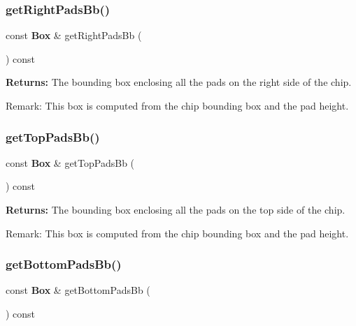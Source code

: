 \subsubsection{\texorpdfstring{get\+Right\+Pads\+Bb()}{getRightPadsBb()}}
{\footnotesize\ttfamily const \textbf{ Box} \& get\+Right\+Pads\+Bb (\begin{DoxyParamCaption}{ }\end{DoxyParamCaption}) const\hspace{0.3cm}{\ttfamily [inline]}}

{\bfseries Returns\+:} The bounding box enclosing all the pads on the right side of the chip.

\begin{DoxyParagraph}{Remark\+: This box is computed from the chip bounding box and the pad height. }

\end{DoxyParagraph}
\mbox{\label{classKatabatic_1_1ChipTools_ad31ff1dbfdf55216d684b4032a73db6b}} 
\subsubsection{\texorpdfstring{get\+Top\+Pads\+Bb()}{getTopPadsBb()}}
{\footnotesize\ttfamily const \textbf{ Box} \& get\+Top\+Pads\+Bb (\begin{DoxyParamCaption}{ }\end{DoxyParamCaption}) const\hspace{0.3cm}{\ttfamily [inline]}}

{\bfseries Returns\+:} The bounding box enclosing all the pads on the top side of the chip.

\begin{DoxyParagraph}{Remark\+: This box is computed from the chip bounding box and the pad height. }

\end{DoxyParagraph}
\mbox{\label{classKatabatic_1_1ChipTools_aad46c56aeb14b07fcdfe93b51c554828}} 
\subsubsection{\texorpdfstring{get\+Bottom\+Pads\+Bb()}{getBottomPadsBb()}}
{\footnotesize\ttfamily const \textbf{ Box} \& get\+Bottom\+Pads\+Bb (\begin{DoxyParamCaption}{ }\end{DoxyParamCaption}) const\hspace{0.3cm}{\ttfamily [inline]}}

